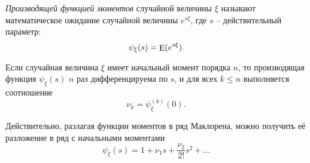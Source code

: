 \begin{to_def}
    \textit{Производящей функцией моментов} случайной величины $\xi$ называют математическое ожидание случайной величины $e^{s \xi}$, где $s$ -- действительный параметр:
    \begin{equation}
        \psi_\xi (s) = \mathop{\mathrm{E}}\nolimits (e^{s \xi}).
    \end{equation}
\end{to_def}

\begin{to_thr}[]
    Если случайная величина $\xi$ имеет начальный момент порядка $n$, то производящая функция $\psi_\xi (s)$ $n$ раз дифференцируема по $s$, и для всех $k \leq n$ выполняется соотношение
    \begin{equation}
        \nu_k = \psi^{(k)}_\xi (0).
    \end{equation}
\end{to_thr}

Действительно, разлагая функции моментов в ряд Маклорена, можно получить её разложение в ряд с начальными моментами
\begin{equation*}
    \psi_\xi (s) = 1 + \nu_1 s + \frac{\nu_2}{2!} s^2 + \ldots
\end{equation*}